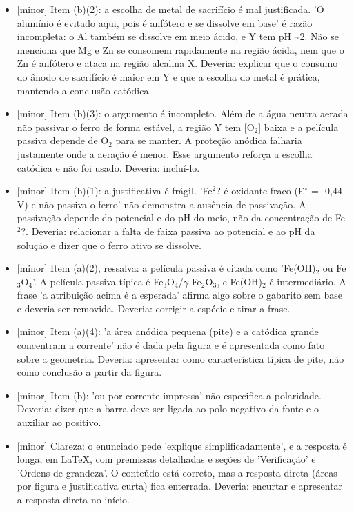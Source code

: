 \documentclass{article}%
\begin{document}
\begin{itemize}%
\item%
{[}minor{]} Item (b)(2): a escolha de metal de sacrifício é mal justificada. 'O alumínio é evitado aqui, pois é anfótero e se dissolve em base' é razão incompleta: o Al também se dissolve em meio ácido, e Y tem pH \textasciitilde{}2. Não se menciona que Mg e Zn se consomem rapidamente na região ácida, nem que o Zn é anfótero e ataca na região alcalina X. Deveria: explicar que o consumo do ânodo de sacrifício é maior em Y e que a escolha do metal é prática, mantendo a conclusão catódica.%
\item%
{[}minor{]} Item (b)(3): o argumento é incompleto. Além de a água neutra aerada não passivar o ferro de forma estável, a região Y tem {[}O$_{2}${]} baixa e a película passiva depende de O$_{2}$ para se manter. A proteção anódica falharia justamente onde a aeração é menor. Esse argumento reforça a escolha catódica e não foi usado. Deveria: incluí{-}lo.%
\item%
{[}minor{]} Item (b)(1): a justificativa é frágil. 'Fe$^2$? é oxidante fraco (E$^\circ$ = -0,44 V) e não passiva o ferro' não demonstra a ausência de passivação. A passivação depende do potencial e do pH do meio, não da concentração de Fe$^2$?. Deveria: relacionar a falta de faixa passiva ao potencial e ao pH da solução e dizer que o ferro ativo se dissolve.%
\item%
{[}minor{]} Item (a)(2), ressalva: a película passiva é citada como 'Fe(OH)$_{2}$ ou Fe$_{3}$O$_{4}$'. A película passiva típica é Fe$_{3}$O$_{4}$/$\gamma${-}Fe$_{2}$O$_{3}$, e Fe(OH)$_{2}$ é intermediário. A frase 'a atribuição acima é a esperada' afirma algo sobre o gabarito sem base e deveria ser removida. Deveria: corrigir a espécie e tirar a frase.%
\item%
{[}minor{]} Item (a)(4): 'a área anódica pequena (pite) e a catódica grande concentram a corrente' não é dada pela figura e é apresentada como fato sobre a geometria. Deveria: apresentar como característica típica de pite, não como conclusão a partir da figura.%
\item%
{[}minor{]} Item (b): 'ou por corrente impressa' não especifica a polaridade. Deveria: dizer que a barra deve ser ligada ao polo negativo da fonte e o auxiliar ao positivo.%
\item%
{[}minor{]} Clareza: o enunciado pede 'explique simplificadamente', e a resposta é longa, em LaTeX, com premissas detalhadas e seções de 'Verificação' e 'Ordens de grandeza'. O conteúdo está correto, mas a resposta direta (áreas por figura e justificativa curta) fica enterrada. Deveria: encurtar e apresentar a resposta direta no início.%
\end{itemize}%
\end{document}
